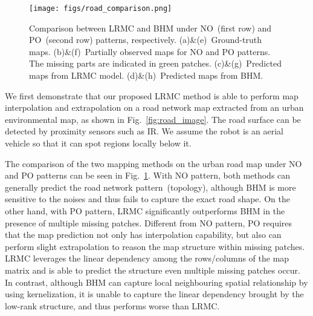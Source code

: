 \begin{figure} %
  \centering
  	{\label{fig:road_comparison}\texttt{[image: figs/road\_comparison.png]}}
  \caption{\small Comparison between LRMC and BHM under NO~(first row) and PO~(second row) patterns, respectively. (a)\&(e)~Ground-truth maps. (b)\&(f)~Partially observed maps for NO and PO patterns. The missing parts are indicated in green patches. (c)\&(g)~Predicted maps from LRMC model. (d)\&(h)~Predicted maps from BHM.
  } \vspace{-10pt}
\label{fig:road_comparison}  
\end{figure}



We first demonstrate that our proposed LRMC method is able to perform map interpolation and extrapolation on a road network map extracted from an  urban environmental map, as shown in Fig.~\ref{fig:road_image}. 
The road surface can be detected by proximity sensors such as IR. We assume the robot is an aerial vehicle so that it can spot regions locally below it. 

The comparison of the two mapping methods on the urban road map under NO and PO patterns can be seen in Fig.~\ref{fig:road_comparison}. With NO pattern, both methods can generally predict the road network pattern~(topology), although BHM is more sensitive to the noises and thus fails to capture the exact road shape. On the other hand, with PO pattern, LRMC significantly outperforms BHM in the presence of multiple missing patches. 
Different from NO pattern, PO requires that the map prediction not only has interpolation capability, but also can perform slight extrapolation to reason the map structure within missing patches. 
LRMC leverages the linear dependency among the rows/columns of the map matrix and is able to predict the structure even multiple missing patches occur. In contrast, although BHM can capture local neighbouring spatial relationship by using kernelization, it is unable to capture the linear dependency brought by the low-rank structure, and thus performs worse than LRMC. 





